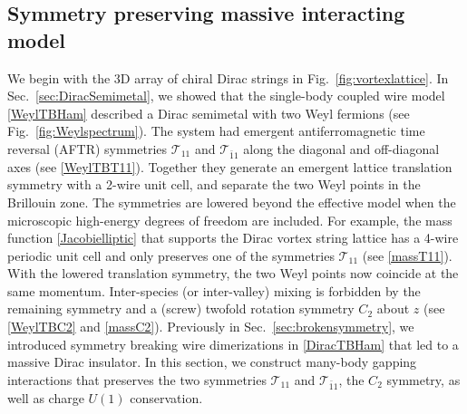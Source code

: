 

\subsection{Symmetry preserving massive interacting model}\label{sec:interactionmodels}

We begin with the 3D array of chiral Dirac strings in Fig.~\ref{fig:vortexlattice}. In Sec.~\ref{sec:DiracSemimetal}, we showed that the single-body coupled wire model \eqref{WeylTBHam} described a Dirac semimetal with two Weyl fermions (see Fig.~\ref{fig:Weylspectrum}). The system had emergent antiferromagnetic time reversal (AFTR) symmetries $\mathcal{T}_{11}$ and $\mathcal{T}_{\bar{1}1}$ along the diagonal and off-diagonal axes (see \eqref{WeylTBT11}). Together they generate an emergent lattice translation symmetry with a 2-wire unit cell, and separate the two Weyl points in the Brillouin zone. The symmetries are lowered beyond the effective model when the microscopic high-energy degrees of freedom are included. For example, the mass function \eqref{Jacobielliptic} that supports the Dirac vortex string lattice has a 4-wire periodic unit cell and only preserves one of the \AFTR symmetries $\mathcal{T}_{11}$ (see \eqref{massT11}). With the lowered translation symmetry, the two Weyl points now coincide at the same momentum. Inter-species (or inter-valley) mixing is forbidden by the remaining \AFTR symmetry and a (screw) twofold rotation symmetry $C_2$ about $z$ (see \eqref{WeylTBC2} and \eqref{massC2}). Previously in Sec.~\ref{sec:brokensymmetry}, we introduced symmetry breaking wire dimerizations in \eqref{DiracTBHam} that led to a massive Dirac insulator. In this section, we construct many-body gapping interactions that preserves the two \AFTR symmetries $\mathcal{T}_{11}$ and $\mathcal{T}_{\bar{1}1}$, the $C_2$ symmetry, as well as charge $U(1)$ conservation. 

